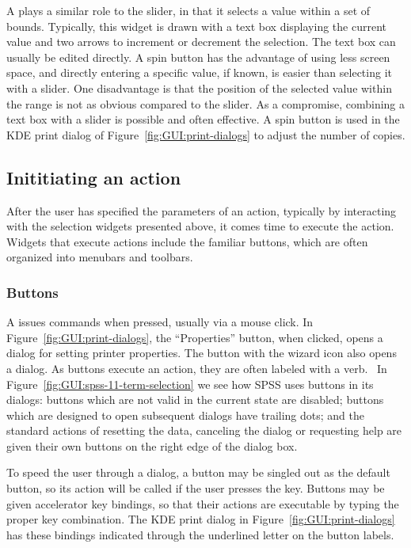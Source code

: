 A  plays a similar role to the slider, in that it
selects a value within a set of bounds. Typically, this widget is
drawn with a text box displaying the current value and two arrows to
increment or decrement the selection. The text box can usually be
edited directly.  A spin button has the advantage of using less screen
space, and directly entering a specific value, if known, is easier
than selecting it with a slider. One disadvantage is that the position
of the selected value within the range is not as obvious compared to
the slider. As a compromise, combining a text box with a slider is
possible and often effective. A spin button is used in the KDE print
dialog of Figure~\ref{fig:GUI:print-dialogs} to adjust the number of
copies.

\subsection{Inititiating an action}

After the user has specified the parameters of an action, typically
by interacting with the selection widgets presented above, it comes time to
execute the action. Widgets that execute actions include the familiar
buttons, which are often organized into menubars and toolbars.

\subsubsection{Buttons}
\label{sec:GUI:buttons}

A  issues commands when pressed, usually via a mouse click.
In Figure~\ref{fig:GUI:print-dialogs}, the ``Properties'' button, when
clicked, opens a dialog for setting printer properties. The button
with the wizard icon also opens a dialog.  As buttons execute an
action, they are often labeled with a verb.~\citep{APPLE:HIG} In
Figure~\ref{fig:GUI:spss-11-term-selection} we see how SPSS uses
buttons in its dialogs: buttons which are not valid in the current
state are disabled; buttons which are designed to open subsequent
dialogs have trailing dots; and the standard actions of resetting the
data, canceling the dialog or requesting help are given their own
buttons on the right edge of the dialog box.

To speed the user through a dialog, a button may be singled out as the
default button, so its action will be called if the user presses the
 key. Buttons may be given accelerator key
bindings, so that their actions are executable by typing the proper key
combination. The KDE print dialog in
Figure~\ref{fig:GUI:print-dialogs} has these bindings indicated
through the underlined letter on the button labels.

